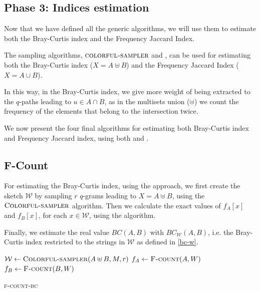 \clearpage

\subsection*{Phase 3: Indices estimation}

Now that we have defined all the generic algorithms, we will use them to estimate both the Bray-Curtis index and the Frequency Jaccard Index.\medskip

The sampling algorithms, $\textsc{colorful-sampler}$ and \fsamp, can be used for estimating both the Bray-Curtis index ($X = A \uplus B$) and the Frequency Jaccard Index ($X = A \cup B$).

In this way, in the Bray-Curtis index, we give more weight of being extracted to the $q$-paths leading to $u \in A \cap B$, as in the multisets union ($\uplus$) we count the frequency of the elements that belong to the intersection twice.\medskip

We now present the four final algorithms for estimating both Bray-Curtis index and Frequency Jaccard index, using both \fcount and \fsamp.

\subsection*{F-Count}

For estimating the Bray-Curtis index, using the \fcount approach, we first create the sketch $\mathcal{W}$ by sampling $r$ $q$-grams leading to $X = A \uplus B$, using the $\textsc{Colorful-sampler}$ algorithm. Then we calculate the exact values of $f_{A}[x]$ and $f_{B}[x]$, for each $x \in \mathcal{W}$, using the \fcount algorithm.

Finally, we estimate the real value $BC(A,B)$ with $BC_{ \mathcal{W} }(A,B)$, i.e. the Bray-Curtis index restricted to the strings in $\mathcal{W}$ as defined in \eqref{bc-w}.

\begin{algorithm}[h]
	\small
	\DontPrintSemicolon
	\BlankLine
	$\mathcal{W} \gets \textsc{Colorful-sampler}(A \uplus B, M, r)$ \;
	$f_{A} \gets \textsc{F-count}(A, W)$ \;
	$f_{B} \gets \textsc{F-count}(B, W)$ \;
	\BlankLine
	\caption{\textsc{f-count-bc}}
	\label{alg:f-count-bc}
\end{algorithm}

